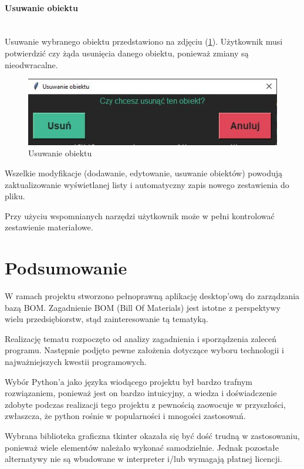 \documentclass[12pt,twoside]{article}
\begin{document}
\paragraph*{Usuwanie obiektu}\mbox{}\\
Usuwanie wybranego obiektu przedstawiono na zdjęciu (\ref{fig:app:bom_remove_item}). Użytkownik musi potwierdzić czy żąda usunięcia danego obiektu, ponieważ zmiany są nieodwracalne.

\begin{figure}[H]
	\centering
	\includegraphics[width=\textwidth]{figures/app/bom_remove_item.jpg}
	\caption{Usuwanie obiektu}
\label{fig:app:bom_remove_item}
\end{figure}

Wszelkie modyfikacje (dodawanie, edytowanie, usuwanie obiektów) powodują zaktualizowanie wyświetlanej listy i automatyczny zapis nowego zestawienia do pliku.

Przy użyciu wspomnianych narzędzi użytkownik może w pełni kontrolować zestawienie materiałowe.

\clearpage
\section{Podsumowanie}
W ramach projektu stworzono pełnoprawną aplikację desktop'ową do zarządzania bazą BOM. Zagadnienie BOM (Bill Of Materials) jest istotne z perspektywy wielu przedsiębiorstw, stąd zainteresowanie tą tematyką.

Realizację tematu rozpoczęto od analizy zagadnienia i sporządzenia zaleceń programu. Następnie podjęto pewne założenia dotyczące wyboru technologii i najważniejszych kwestii programowych. 

Wybór Python'a jako języka wiodącego projektu był bardzo trafnym rozwiązaniem, ponieważ jest on bardzo intuicyjny, a wiedza i doświadczenie zdobyte podczas realizacji tego projektu z pewnością zaowocuje w przyszłości, zwłaszcza, że python rośnie w popularności i mnogości zastosowań.

Wybrana biblioteka graficzna tkinter okazała się być dość trudną w zastosowaniu, ponieważ wiele elementów należało wykonać samodzielnie. Jednak pozostałe alternatywy nie są wbudowane w interpreter i/lub wymagają płatnej licencji.
\end{document}
